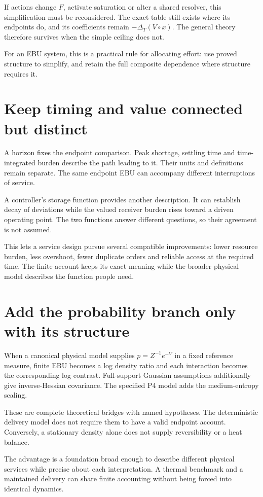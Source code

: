 If actions change $F$, activate saturation or alter a shared resolver, this simplification must be reconsidered. The exact table still exists where its endpoints do, and its coefficients remain $-\Delta_T(V\circ x)$. The general theory therefore survives when the simple ceiling does not.

For an EBU system, this is a practical rule for allocating effort: use proved structure to simplify, and retain the full composite dependence where structure requires it.

\section{Keep timing and value connected but distinct}
A horizon fixes the endpoint comparison. Peak shortage, settling time and time-integrated burden describe the path leading to it. Their units and definitions remain separate. The same endpoint EBU can accompany different interruptions of service.

A controller's storage function provides another description. It can establish decay of deviations while the valued receiver burden rises toward a driven operating point. The two functions answer different questions, so their agreement is not assumed.

This lets a service design pursue several compatible improvements: lower resource burden, less overshoot, fewer duplicate orders and reliable access at the required time. The finite account keeps its exact meaning while the broader physical model describes the function people need.

\section{Add the probability branch only with its structure}
When a canonical physical model supplies $p=Z^{-1}e^{-V}$ in a fixed reference measure, finite EBU becomes a log density ratio and each interaction becomes the corresponding log contrast. Full-support Gaussian assumptions additionally give inverse-Hessian covariance. The specified P4 model adds the medium-entropy scaling.

These are complete theoretical bridges with named hypotheses. The deterministic delivery model does not require them to have a valid endpoint account. Conversely, a stationary density alone does not supply reversibility or a heat balance.

The advantage is a foundation broad enough to describe different physical services while precise about each interpretation. A thermal benchmark and a maintained delivery can share finite accounting without being forced into identical dynamics.

